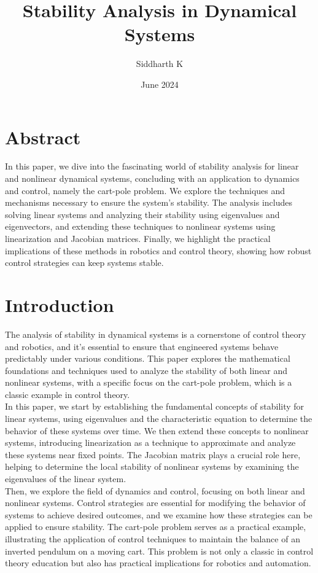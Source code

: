 \documentclass[12pt]{article}
\title{Stability Analysis in Dynamical Systems}
\author{Siddharth K}
\date{June 2024}
\begin{document}
\maketitle

\section{Abstract}

In this paper, we dive into the fascinating world of stability analysis for linear and nonlinear dynamical systems, concluding with an application to dynamics and control, namely the cart-pole problem. We explore the techniques and mechanisms necessary to ensure the system's stability. The analysis includes solving linear systems and analyzing their stability using eigenvalues and eigenvectors, and extending these techniques to nonlinear systems using linearization and Jacobian matrices. Finally, we highlight the practical implications of these methods in robotics and control theory, showing how robust control strategies can keep systems stable.

\section{Introduction}

The analysis of stability in dynamical systems is a cornerstone of control theory and robotics, and it’s essential to ensure that engineered systems behave predictably under various conditions. This paper explores the mathematical foundations and techniques used to analyze the stability of both linear and nonlinear systems, with a specific focus on the cart-pole problem, which is a classic example in control theory. \\


In this paper, we start by establishing the fundamental concepts of stability for linear systems, using eigenvalues and the characteristic equation to determine the behavior of these systems over time. We then extend these concepts to nonlinear systems, introducing linearization as a technique to approximate and analyze these systems near fixed points. The Jacobian matrix plays a crucial role here, helping to determine the local stability of nonlinear systems by examining the eigenvalues of the linear system. \\


Then, we explore the field of dynamics and control, focusing on both linear and nonlinear systems. Control strategies are essential for modifying the behavior of systems to achieve desired outcomes, and we examine how these strategies can be applied to ensure stability. The cart-pole problem serves as a practical example, illustrating the application of control techniques to maintain the balance of an inverted pendulum on a moving cart. This problem is not only a classic in control theory education but also has practical implications for robotics and automation. \\
\end{document}
